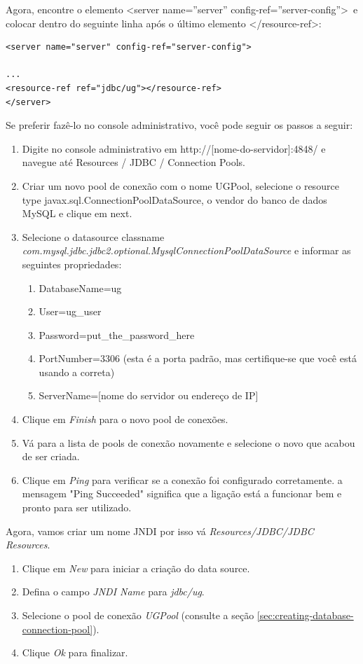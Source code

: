 \documentclass[envcountsame,envcountchap,letterpaper]{svmono}
\begin{document}
Agora, encontre o elemento \textless server name=''server'' config-ref=''server-config''\textgreater \ e colocar dentro do seguinte linha após o último elemento \textless /resource-ref\textgreater :

\begin{verbatim}
<server name="server" config-ref="server-config">

...
<resource-ref ref="jdbc/ug"></resource-ref>
</server>
\end{verbatim}

Se preferir fazê-lo no console administrativo, você pode seguir os passos a seguir:

\begin{enumerate}
\item  Digite no console administrativo em http://[nome-do-servidor]:4848/ e navegue até Resources / JDBC / Connection Pools.
\item Criar um novo pool de conexão com o nome UGPool, selecione o resource type javax.sql.ConnectionPoolDataSource, o vendor do banco de dados MySQL e clique em next.
\item Selecione o datasource classname \\ \textit{com.mysql.jdbc.jdbc2.optional.MysqlConnectionPoolDataSource} e informar as seguintes propriedades:
   \begin{enumerate}
   \item DatabaseName=ug
   \item User=ug\_user
   \item Password=put\_the\_password\_here
   \item PortNumber=3306 (esta é a porta padrão, mas certifique-se
    que você está usando a correta)
   \item ServerName=[nome do servidor ou endereço de IP]
   \end{enumerate}
\item Clique em \textit{Finish} para o novo pool de conexões.
\item Vá para a lista de pools de conexão novamente e selecione o novo que acabou de ser criada.
\item Clique em \textit{Ping} para verificar se a conexão foi configurado corretamente. a mensagem "Ping Succeeded" significa que a ligação está a funcionar bem e pronto para ser utilizado.
\end{enumerate}

Agora, vamos criar um nome JNDI por isso vá \textit{Resources/JDBC/JDBC Resources}.

\begin{enumerate}
\item Clique em \textit{New} para iniciar a criação do data source.
\item Defina o campo \textit{JNDI Name} para \textit{jdbc/ug}.
\item Selecione o pool de conexão \textit{UGPool} (consulte a seção \ref{sec:creating-database-connection-pool}).
\item Clique \textit{Ok} para finalizar.
\end{enumerate}
\end{document}
